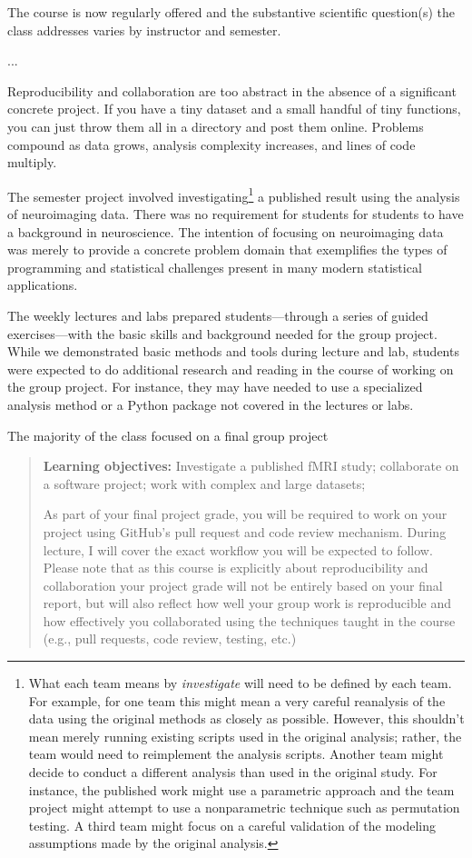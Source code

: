 The course is now regularly offered and the substantive scientific question(s)
the class addresses varies by instructor and semester.

...

Reproducibility and collaboration are too abstract in the absence of a
significant concrete project.
If you have a tiny dataset and a small handful of tiny functions, you can
just throw them all in a directory and post them online.
Problems compound as data grows, analysis complexity increases,
and lines of code multiply.

The semester project involved investigating\footnote{What each team means by
\emph{investigate} will need to be defined by each team.
For example, for one team this might mean a very careful reanalysis of the data
using the original methods as closely as possible.  However, this shouldn't
mean merely running existing scripts used in the original analysis; rather, the
team would need to reimplement the analysis scripts.  Another team might decide
to conduct a different analysis than used in the original study.  For instance,
the published work might use a parametric approach and the team project might
attempt to use a nonparametric technique such as permutation testing.  A third
team might focus on a careful validation of the modeling assumptions made by
the original analysis.}
a published result using the analysis of neuroimaging data.
There was no requirement for students for students to have a background in
neuroscience.
The intention of focusing on neuroimaging data was  merely to provide a
concrete problem domain that exemplifies the types of programming and
statistical challenges present in many modern statistical applications.

The weekly lectures and labs prepared students---through a
series of guided exercises---with the basic skills and
background needed for the group project.
While we demonstrated basic methods and tools during lecture and lab,
students were expected to do additional research and reading in the course
of working on the group project.
For instance, they may have needed to use a specialized analysis
method or a Python package not covered in the lectures or labs.

The majority of the class focused on a final group project

\begin{quote}
\textbf{Learning objectives:} Investigate a published fMRI study;
collaborate on a software project; work with complex and large datasets;

As part of your final project grade, you will be required to work on your
project using GitHub's pull request and code review mechanism.  During lecture,
I will cover the exact workflow you will be expected to follow.  Please note
that as this course is explicitly about reproducibility and collaboration your
project grade will not be entirely based on your final report, but will also
reflect how well your group work is reproducible and how effectively you
collaborated using the techniques taught in the course (e.g., pull requests,
code review, testing, etc.)
\end{quote}

